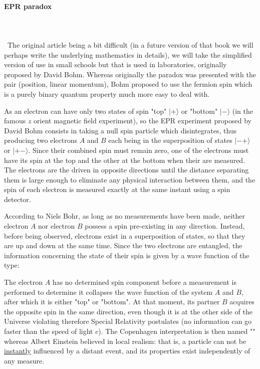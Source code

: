 	\paragraph{EPR paradox}\mbox{}\\\\\
	The original article being a bit difficult (in a future version of that book we will perhaps write the underlying mathematics in details), we will take the simplified version of use in small schools but that is used in laboratories, originally proposed by David Bohm. Whereas originally the paradox was presented with the pair (position, linear momentum), Bohm proposed to use the fermion spin which is a purely binary quantum property much more easy to deal with.
	
	As an electron can have only two states of spin "top" $|+\rangle$ or "bottom" $|-\rangle$ (in the famous $z$ orient magnetic field experiment), so the EPR experiment proposed by David Bohm consists in taking a null spin particle which disintegrates, thus producing two electrons $A$ and $B$ each being in the superposition of states $|-+\rangle$ or $|+-\rangle$. Since their combined spin must remain zero, one of the electrons must have its spin at the top and the other at the bottom when their are measured. The electrons are the driven in opposite directions until the distance separating them is large enough to eliminate any physical interaction between them, and the spin of each electron is measured exactly at the same instant using a spin detector.
	
	According to Niels Bohr, as long as no measurements have been made, neither electron $A$ nor electron $B$ possess a spin pre-existing in any direction. Instead, before being observed, electrons exist in a superposition of states, so that they are up and down at the same time. Since the two electrons are entangled, the information concerning the state of their spin is given by a wave function of the type:
	
	The electron $A$ has no determined spin component before a measurement is performed to determine it collapses the wave function of the system $A$ and $B$, after which it is either "top" or "bottom". At that moment, its partner $B$ acquires the opposite spin in the same direction, even though it is at the other side of the Universe violating therefore Special Relativity postulates (no information can go faster than the speed of light $c$). The Copenhagen interpretation is then named "" whereas Albert Einstein believed in local realism: that is, a particle can not be \underline{instantly} influenced by a distant event, and its properties exist independently of any measure.
	

